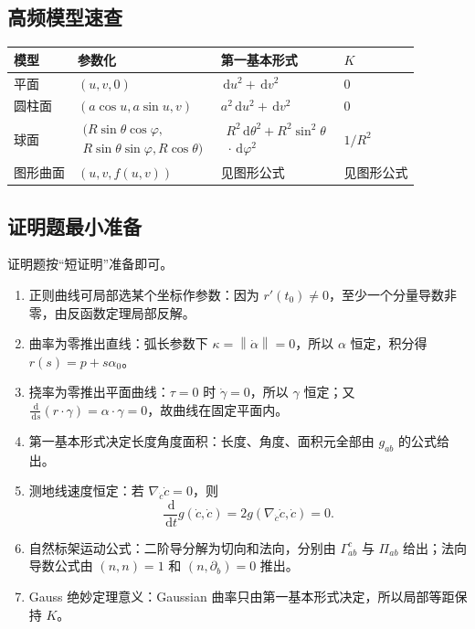 \documentclass[UTF8,12pt,a4paper]{ctexart}
\newcommand{\dd}{\,\mathrm d}
\newcommand{\norm}[1]{\left\lVert #1\right\rVert}
\begin{document}
\subsection{高频模型速查}

\begin{longtable}{@{}>{\raggedright\arraybackslash}p{}>{\raggedright\arraybackslash}p{}>{\raggedright\arraybackslash}p{}>{\raggedright\arraybackslash}p{}@{}}
\toprule
模型 & 参数化 & 第一基本形式 & $K$\\
\midrule
平面 & $(u,v,0)$ & $\dd u^2+\dd v^2$ & $0$\\
圆柱面 & $(a\cos u,a\sin u,v)$ & $a^2\dd u^2+\dd v^2$ & $0$\\
球面 & $\begin{gathered}(R\sin\theta\cos\varphi,\\ R\sin\theta\sin\varphi,R\cos\theta)\end{gathered}$ & $\begin{gathered}R^2\dd\theta^2+R^2\sin^2\theta\\ {}\cdot\dd\varphi^2\end{gathered}$ & $1/R^2$\\
图形曲面 & $(u,v,f(u,v))$ & 见图形公式 & 见图形公式\\
\bottomrule
\end{longtable}

\subsection{证明题最小准备}

证明题按“短证明”准备即可。

\begin{enumerate}
\item 正则曲线可局部选某个坐标作参数：因为 $r'(t_0)\ne0$，至少一个分量导数非零，由反函数定理局部反解。
\item 曲率为零推出直线：弧长参数下 $\kappa=\norm{\dot\alpha}=0$，所以 $\alpha$ 恒定，积分得 $r(s)=p+s\alpha_0$。
\item 挠率为零推出平面曲线：$\tau=0$ 时 $\dot\gamma=0$，所以 $\gamma$ 恒定；又 $\frac{\dd}{\dd s}(r\cdot\gamma)=\alpha\cdot\gamma=0$，故曲线在固定平面内。
\item 第一基本形式决定长度角度面积：长度、角度、面积元全部由 $g_{ab}$ 的公式给出。
\item 测地线速度恒定：若 $\nabla_{\dot c}\dot c=0$，则
\[
\frac{\dd}{\dd t}g(\dot c,\dot c)=2g(\nabla_{\dot c}\dot c,\dot c)=0.
\]
\item 自然标架运动公式：二阶导分解为切向和法向，分别由 $\Gamma^c_{ab}$ 与 $\Pi_{ab}$ 给出；法向导数公式由 $(n,n)=1$ 和 $(n,\partial_b)=0$ 推出。
\item Gauss 绝妙定理意义：Gaussian 曲率只由第一基本形式决定，所以局部等距保持 $K$。
\end{enumerate}
\end{document}
